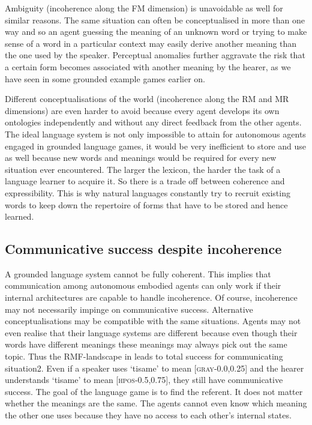 Ambiguity (incoherence along the FM dimension) 
is unavoidable as well for similar reasons. 
The same situation can often be conceptualised in more than 
one way and so an agent guessing the meaning of an unknown 
word or trying to make sense of a word in a particular 
context may easily derive another meaning than the one 
used by the speaker. Perceptual anomalies further aggravate
the risk that a certain form becomes associated with 
another meaning by the hearer, as we have seen in some
grounded example games earlier on. 

Different conceptualisations of the world (incoherence 
along the RM and MR dimensions) are even harder to 
avoid because every agent develops its own 
ontologies independently and without any direct 
feedback from the other agents. 
The ideal language system is not only impossible to 
attain for autonomous agents engaged in grounded
language games, it would be very 
inefficient to store and use as well because 
new words and meanings would be required for every new 
situation ever encountered. The larger the lexicon,
the harder the task of a language learner to acquire it. 
So there is a trade off between coherence and expressibility. 
This is why natural languages constantly try to recruit existing 
words to keep down the repertoire of \enlargethispage{2\baselineskip} 
forms that have to be stored and hence learned.

\subsection{Communicative success despite incoherence}

A grounded language system cannot be fully coherent. 
This implies that communication among autonomous 
embodied agents can only work if their internal 
architectures are capable to handle incoherence. 
Of course, incoherence may not necessarily 
impinge on communicative success. 
Alternative conceptualisations may 
be compatible with the same situations. Agents may not
even realise that their language systems are different
because even though their words have different 
meanings these meanings may always pick out the 
same topic. Thus 
the RMF-landscape in  leads to total
success for communicating situation2. Even if 
a speaker uses `tisame' to mean [\textsc{gray}-0.0,0.25] and the hearer
understands `tisame' to mean [\textsc{hpos}-0.5,0.75], they 
still have communicative success. The goal 
of the language game is to find the referent. It does
not matter whether the meanings are the same. The agents
cannot even know which meaning the other one uses
because they have no access to each other's internal states. 

